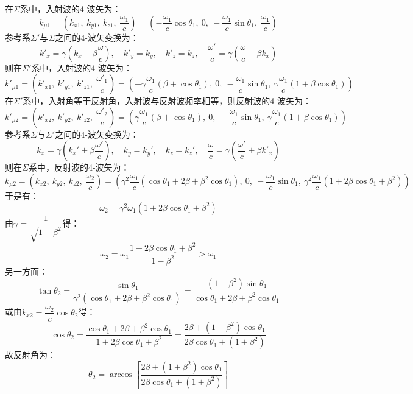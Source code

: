 \documentclass[a4paper,fontset=none]{ctexart}
\begin{document}
\begin{itemize}
    在$\varSigma$系中，入射波的4-波矢为：
    \[
        k_{\mu1} = \left(k_{x1},\ k_{y1},\ k_{z1},\ \frac{\omega_1}{c}\right) = \left(-\frac{\omega_1}{c}\cos\theta_1,\ 0,\ -\frac{\omega_1}{c}\sin\theta_1,\ \frac{\omega_1}{c}\right)
    \]
    参考系$\varSigma'$与$\varSigma$之间的4-波矢变换为：
    \[
        k'_x = \gamma\left(k_x-\beta\frac{\omega}{c}\right),\quad k'_y = k_y,\quad k'_z = k_z,\quad \frac{\omega'}{c} = \gamma\left(\frac{\omega}{c}-\beta k_x\right)
    \]
    则在$\varSigma'$系中，入射波的4-波矢为：
    \[
        k'_{\mu1} = \left(k'_{x1},\ k'_{y1},\ k'_{z1},\ \frac{\omega'_1}{c}\right) = \left(-\gamma\frac{\omega_1}{c}(\beta+\cos\theta_1),\ 0,\ -\frac{\omega_1}{c}\sin\theta_1,\ \gamma\frac{\omega_1}{c}(1+\beta\cos\theta_1)\right)
    \]
    在$\varSigma'$系中，入射角等于反射角，入射波与反射波频率相等，则反射波的4-波矢为：
    \[
        k'_{\mu2} = \left(k'_{x2},\ k'_{y2},\ k'_{z2},\ \frac{\omega'_2}{c}\right) = \left(\gamma\frac{\omega_1}{c}(\beta+\cos\theta_1),\ 0,\ -\frac{\omega_1}{c}\sin\theta_1,\ \gamma\frac{\omega_1}{c}(1+\beta\cos\theta_1)\right)
    \]
    参考系$\varSigma$与$\varSigma'$之间的4-波矢变换为：
    \[
        k_x = \gamma\left(k_x'+\beta\frac{\omega'}{c}\right),\quad k_y = k_y',\quad k_z = k_z',\quad \frac{\omega}{c} = \gamma\left(\frac{\omega'}{c}+\beta k'_x\right)
    \]
    则在$\varSigma$系中，反射波的4-波矢为：
    \[
        k_{\mu2} = \left(k_{x2},\ k_{y2},\ k_{z2},\ \frac{\omega_2}{c}\right) = \left(\gamma^2\frac{\omega_1}{c}\left(\cos\theta_1+2\beta+\beta^2\cos\theta_1\right),\ 0,\ -\frac{\omega_1}{c}\sin\theta_1,\ \gamma^2\frac{\omega_1}{c}\left(1+2\beta\cos\theta_1+\beta^2\right)\right)
    \]
    于是有：
    \[
        \omega_2 = \gamma^2\omega_1\left(1+2\beta\cos\theta_1+\beta^2\right)
    \]
    由$\gamma=\dfrac{1}{\sqrt{1-\beta^2}}$得：
    \[
        \omega_2 = \omega_1 \frac{1 + 2\beta\cos\theta_1 + \beta^2}{1-\beta^2} > \omega_1
    \]
    另一方面：
    \[
        \tan\theta_2 = \frac{\sin\theta_1}{\gamma^2\left(\cos\theta_1+2\beta+\beta^2\cos\theta_1\right)} = \frac{\left(1-\beta^2\right)\sin\theta_1}{\cos\theta_1 + 2\beta + \beta^2\cos\theta_1}
    \]
    或由$k_{x2}=\dfrac{\omega_2}{c}\cos\theta_2$得：
    \[
        \cos\theta_2 = \frac{\cos\theta_1 + 2\beta + \beta^2\cos\theta_1}{1 + 2\beta\cos\theta_1 + \beta^2} = \frac{2\beta + \left(1+\beta^2\right)\cos\theta_1}{2\beta\cos\theta_1 + \left(1+\beta^2\right)}
    \]
    故反射角为：
    \[
        \theta_2 = \arccos\left[\frac{2\beta + \left(1+\beta^2\right)\cos\theta_1}{2\beta\cos\theta_1 + \left(1+\beta^2\right)}\right]
    \]

\end{itemize}
\end{document}
